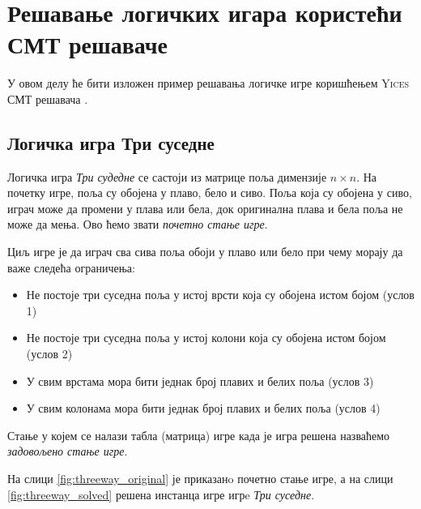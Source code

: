 \documentclass[a4paper]{article}
\begin{document}
\section{Решавање логичких игара користећи СМТ решаваче}
\label{sec:logicSmt}
У овом делу ће бити изложен пример решавања логичке игре коришћењем \textsc{Yices} СМТ решавача \cite{yices}.

\subsection{Логичка игра Три суседне}
Логичка игра \emph{Три судедне} се састоји из матрице поља димензије $n \times n$. На почетку игре,
поља су обојена у плаво, бело и сиво. Поља која су обојена у сиво, играч може да промени у плава или бела,
док оригинална плава и бела поља не може да мења. Ово ћемо звати \emph{почетно стање игре}.

Циљ игре је да играч сва сива поља обоји у плаво или бело при чему морају да важе следећа ограничења:
\begin{itemize}
    \item Не постоје три суседна поља у истој врсти која су обојена истом бојом (услов 1)
    \item Не постоје три суседна поља у истој колони која су обојена истом бојом (услов 2)
    \item У свим врстама мора бити једнак број плавих и белих поља (услов 3)
    \item У свим колонама мора бити једнак број плавих и белих поља (услов 4)
\end{itemize}

Стање у којем се налази табла (матрица) игре када је игра решена назваћемо \emph{задовољено стање игре}.

На слици \ref{fig:threeway_original} је приказанo почетно стање игре, а на слици \ref{fig:threeway_solved} решена инстанца игре игрe \emph{Три суседне}.
\end{document}
